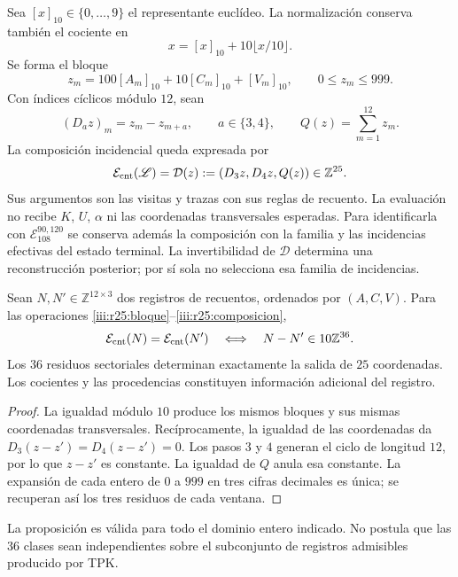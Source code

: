 Sea $[x]_{10}\in\{0,\ldots,9\}$ el representante euclídeo.
La normalización conserva también el cociente en
\[
 x=[x]_{10}+10\lfloor x/10\rfloor.
\]
Se forma el bloque
\begin{equation}
 z_m=100[A_m]_{10}+10[C_m]_{10}+[V_m]_{10},
 \qquad 0\leq z_m\leq999.
 \label{iii:r25:bloque}
\end{equation}
Con índices cíclicos módulo $12$, sean
\[
 (D_a z)_m=z_m-z_{m+a},\qquad a\in\{3,4\},
 \qquad Q(z)=\sum_{m=1}^{12}z_m.
\]
La composición incidencial queda expresada por
\begin{equation}
 \mathcal E_{\rm cnt}(\mathscr L)
 =\mathcal D(z):=(D_3z,D_4z,Q(z))\in\mathbb Z^{25}.
 \label{iii:r25:composicion}
\end{equation}
Sus argumentos son las visitas y trazas con sus reglas de recuento.
La evaluación no recibe $K$, $U$, $\alpha$ ni las coordenadas
transversales esperadas. Para identificarla con
$\mathcal E_{108}^{90,120}$ se conserva además la composición con
la familia y las incidencias efectivas del estado terminal. La
invertibilidad de $\mathcal D$ determina una reconstrucción posterior;
por sí sola no selecciona esa familia de incidencias.

\begin{proposition}
\label{iii:r25:residuos}
Sean $N,N'\in\mathbb Z^{12\times3}$ dos registros de recuentos,
ordenados por $(A,C,V)$. Para las operaciones
\eqref{iii:r25:bloque}--\eqref{iii:r25:composicion},
\[
 \mathcal E_{\rm cnt}(N)=\mathcal E_{\rm cnt}(N')
 \quad\Longleftrightarrow\quad N-N'\in10\mathbb Z^{36}.
\]
Los $36$ residuos sectoriales determinan exactamente la salida de
$25$ coordenadas. Los cocientes y las procedencias constituyen
información adicional del registro.
\end{proposition}
\begin{proof}
La igualdad módulo $10$ produce los mismos bloques y sus mismas
coordenadas transversales. Recíprocamente, la igualdad de las
coordenadas da $D_3(z-z')=D_4(z-z')=0$. Los pasos $3$ y $4$
generan el ciclo de longitud $12$, por lo que $z-z'$ es constante.
La igualdad de $Q$ anula esa constante. La expansión de cada entero
de $0$ a $999$ en tres cifras decimales es única; se recuperan así
los tres residuos de cada ventana.
\end{proof}

La proposición es válida para todo el dominio entero indicado. No
postula que las $36$ clases sean independientes sobre el subconjunto
de registros admisibles producido por TPK.

